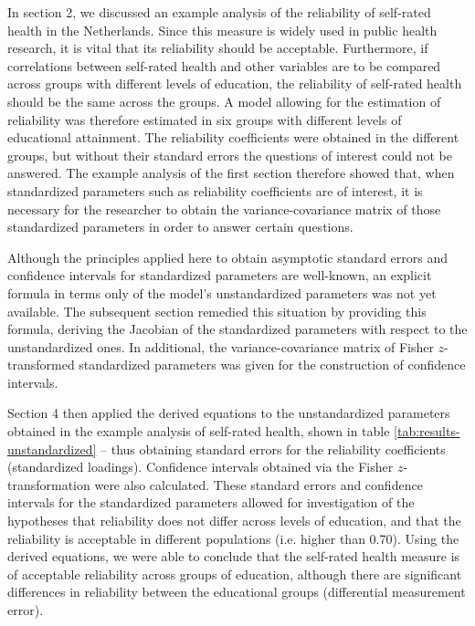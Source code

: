 \documentclass[a4paper, 11pt]{article}
\newcommand{\0}{\boldsymbol{0}}
\begin{document}
In section 2, we discussed an example analysis of the reliability of self-rated health in the Netherlands. Since this measure is widely used in 
 public health research, it is vital that its reliability should be acceptable. Furthermore, if correlations between self-rated health and 
 other variables are to be compared across groups with different levels of education, the reliability of self-rated health should be the 
 same across the groups. A model allowing for the estimation of reliability was therefore estimated in six groups with different levels
 of educational attainment. The reliability coefficients were obtained in the different groups, but without their standard errors the questions
 of interest could not be answered.
The example analysis of the first section therefore showed that, when standardized parameters such as reliability coefficients are of interest, it is necessary for the researcher to obtain the variance-covariance matrix of those standardized parameters in order to answer certain questions.

Although the principles applied here to obtain asymptotic standard errors and confidence intervals for standardized parameters are well-known, 
an explicit formula in terms only of the model's unstandardized parameters was not yet available. The subsequent section remedied this situation by providing this formula, deriving the Jacobian of the standardized parameters with respect to the unstandardized ones. In additional, the 
variance-covariance matrix of Fisher $z$-transformed standardized parameters was given for the construction of confidence intervals.

Section 4 then applied the derived equations to the unstandardized parameters obtained in the example analysis of self-rated health, shown in table \ref{tab:results-unstandardized} -- thus obtaining standard errors for the reliability coefficients (standardized loadings). Confidence intervals obtained via the Fisher $z$-transformation were also calculated. These standard errors and confidence intervals for the standardized parameters allowed for 
investigation of the hypotheses that reliability does not differ across levels of education, and that the reliability is acceptable in 
different populations (i.e. higher than 0.70). Using the derived equations, we were able to conclude that the self-rated health measure
is of acceptable reliability across groups of education, although there are significant differences in reliability between the educational groups (differential measurement error).
\end{document}
